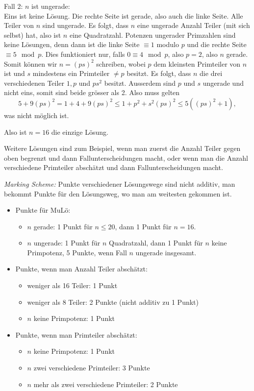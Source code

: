 \documentclass[language=german,style=solution]{smo}
\begin{document}
\begin{enumerate}
Fall 2: $n$ ist ungerade:\\
Eins ist keine Lösung. Die rechte Seite ist gerade, also auch die linke Seite. Alle Teiler von $n$ sind ungerade. Es folgt, dass $n$ eine ungerade Anzahl Teiler (mit sich selbst) hat, also ist $n$ eine Quadratzahl. Potenzen ungerader Primzahlen sind keine Lösungen, denn dann ist die linke Seite $\equiv1$ modulo $p$ und die rechte Seite $\equiv 5 \mod p$. Dies funktioniert nur, falls $0\equiv4 \mod p$, also $p=2$, also $n$ gerade.\\
Somit können wir $n=(ps)^2$ schreiben, wobei $p$ dem kleinsten Primteiler von $n$ ist und $s$ mindestens ein Primteiler $\neq p$ besitzt. Es folgt, dass $n$ die drei verschiedenen Teiler $1,p$ und $ps^2$ besitzt. Ausserdem sind $p$ und $s$ ungerade und nicht eins, somit sind beide grösser als 2. Also muss gelten
\[
5+9(ps)^2=1+4+9(ps)^2\leq 1+p^2+s^2(ps)^2\leq5((ps)^2+1),
\]
was nicht möglich ist.

Also ist $n=16$ die einzige Lösung.

Weitere Lösungen sind zum Beispiel, wenn man zuerst die Anzahl Teiler gegen oben begrenzt und dann Fallunterscheidungen macht, oder wenn man die Anzahl verschiedene Primteiler abschätzt und dann Fallunterscheidungen macht.


\textit{Marking Scheme:}
Punkte verschiedener Lösungswege sind nicht additiv, man bekommt Punkte für den Lösungsweg, wo man am weitesten gekommen ist.
\begin{itemize}
	\item Punkte für MuLö:
	\begin{itemize}
		\item$n$ gerade: 1 Punkt für $n\leq20$, dann 1 Punkt für $n=16$.
		\item$n$ ungerade: 1 Punkt für $n$ Quadratzahl, dann 1 Punkt für $n$ keine Primpotenz, 5 Punkte, 					wenn Fall $n$ ungerade insgesamt.
	\end{itemize}
 	\item Punkte, wenn man Anzahl Teiler abschätzt:
 	\begin{itemize}
 		\item weniger als 16 Teiler: 1 Punkt
 		\item weniger als 8 Teiler: 2 Punkte (nicht additiv zu 1 Punkt)
 		\item $n$ keine Primpotenz: 1 Punkt
 	\end{itemize}
 	\item Punkte, wenn man Primteiler abschätzt:
 	\begin{itemize}
 		\item $n$ keine Primpotenz: 1 Punkt
 		\item $n$ zwei verschiedene Primteiler: 3 Punkte
 		\item $n$ mehr als zwei verschiedene Primteiler: 2 Punkte
 	\end{itemize}
\end{itemize}


\end{enumerate}
\end{document}

